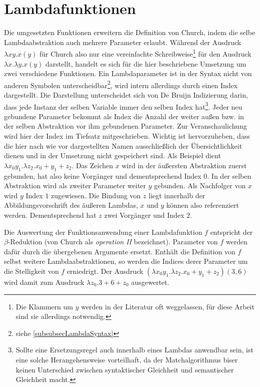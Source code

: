 \section{Lambdafunktionen} \label{subsecLambdafunktionen}
Die umgesetzten Funktionen erweitern die Definition von Church, indem die selbe Lambdaabstraktion auch mehrere Parameter erlaubt. Während der Ausdruck $\lambda x y . x(y)$ für Church also nur eine vereinfachte Schreibweise\footnote{Die Klammern um $y$ werden in der Literatur oft weggelassen, für diese Arbeit sind sie allerdings notwendig.} für den Ausdruck $\lambda x .\lambda y .x(y)$ darstellt, handelt es sich für die hier beschriebene Umsetzung um zwei verschiedene Funktionen. 
Ein Lambdaparameter ist in der Syntax nicht von anderen Symbolen unterscheidbar\footnote{siehe \ref{subsubsecLambdaSyntax}}, wird intern allerdings durch einen Index dargestellt. Die Darstellung unterscheidet sich von De Bruijn Indizierung \cite{deBruijn} darin, dass jede Instanz der selben Variable immer den selben Index hat\footnote{Sollte eine Ersetzungsregel auch innerhalb eines Lambdas anwendbar sein, ist eine solche Herangehensweise vorteilhaft, da der Matchalgorithmus biser keinen Unterschied zwischen syntaktischer Gleichheit und semantischer Gleichheit macht.}.
 Jeder neu gebundene Parameter bekommt als Index die Anzahl der weiter außen bzw. in der selben Abstraktion vor ihm gebundenen Parameter. Zur Veranschaulichung wird hier der Index im Tiefsatz mitgeschrieben. Wichtig ist hervorzuheben, dass die hier nach wie vor dargestellten Namen ausschließlich der Übersichtlichkeit dienen und in der Umsetzung nicht gespeichert sind.
 Als Beispiel dient $\lambda x_0 y_1 .\lambda z_2 .x_0 + y_1 + z_2$. Das Zeichen $x$ wird in der äußersten Abstraktion zuerst gebunden, hat also keine Vorgänger und dementsprechend Index $0$. In der selben Abstraktion wird als zweiter Parameter weiter $y$ gebunden. Als Nachfolger von $x$ wird $y$ Index $1$ zugewiesen. Die Bindung von $z$ liegt innerhalb der Abbildungsvorschrift des äußeren Lambdas, $x$ und $y$ können also referenziert werden. Dementsprechend hat $z$ zwei Vorgänger und Index $2$. 
 
 Die Auswertung der Funktionsanwendung einer Lambdafunktion $f$ entspricht der $\beta$-Reduktion (von Church \cite{ChurchLambda36} als \textit{operation II} bezeichnet). Parameter von $f$ werden dafür durch die übergebenen Argumente ersetzt. Enthält die Definition von $f$ selbst weitere Lambdaabstraktionen, so werden die Indices derer Parameter um die Stelligkeit von $f$ erniedrigt.
 Der Ausdruck $(\lambda x_0 y_1 .\lambda z_2 .x_0 + y_1 + z_2)(3, 6)$ wird damit zum Ausdruck $\lambda z_0 .3 + 6 + z_0$ ausgewertet.
 
